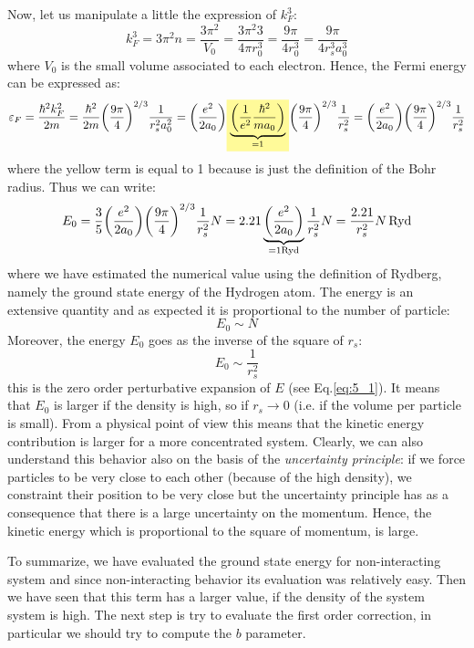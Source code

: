 \documentclass[../main/main.tex]{subfiles}
\begin{document}
Now, let us manipulate a little the expression of  \( k_F^3 \):
\begin{equation*}
  k_F^3 = 3 \pi ^2 n = \frac{3 \pi ^2}{V_0} =
  \frac{3 \pi ^2 3}{4 \pi r_0^3} = \frac{9 \pi }{4 r_0^3} =
  \frac{9 \pi }{4 r_s^3 a_0^3}
\end{equation*}
where \(V_0\) is the small volume associated to each electron.
Hence, the Fermi energy can be expressed as:
\begin{equation*}
  \varepsilon _F = \frac{\hbar ^2 k_F^2}{2m} = \frac{\hbar ^2}{2m} \qty(\frac{9 \pi }{4})^{2/3} \frac{1}{r_s^2 a_0^2}
  = \qty(\frac{e^2}{2 a_0})  \mathcolorbox{yellow!40}{\underbrace{\qty(\frac{1}{e^2} \frac{\hbar ^2}{m a_0})}_{=1}  }
  \qty(\frac{9 \pi }{4})^{2/3 }    \frac{1}{r_s^2}
  = \qty(\frac{e^2}{2 a_0})    \qty(\frac{9 \pi }{4})^{2/3 }    \frac{1}{r_s^2}
\end{equation*}
where the yellow term is equal to 1 because is just the definition of the Bohr radius. Thus we can write:
\begin{equation*}
  E_0 = \frac{3}{5} \qty(\frac{e^2}{2 a_0})    \qty(\frac{9 \pi }{4})^{2/3 }    \frac{1}{r_s^2} N
  = 2.21 \underbrace{ \qty(\frac{e^2}{2 a_0})}_{= 1 \text{Ryd}}  \frac{1}{r_s^2} N
  = \frac{2.21}{r_s^2} N \, \text{Ryd}
\end{equation*}
where we have estimated the numerical value using the definition of Rydberg, namely the ground state energy of the Hydrogen atom.
The energy is an extensive quantity and as expected it is proportional to the number of particle:
\begin{equation*}
  E_0 \sim N
\end{equation*}
Moreover, the energy \( E_0 \) goes as the inverse of the square of \( r_s \):
\begin{equation*}
  E_0 \sim \frac{1}{r_s^2}
\end{equation*}
this is the zero order perturbative expansion of \( E \) (see Eq.\eqref{eq:5_1}).
It means that \( E_0 \) is larger if the density is high, so if \( r_s \rightarrow 0 \) (i.e. if the volume per particle is small).
From a physical point of view this means that the kinetic energy contribution is larger for a more concentrated system.
Clearly, we can also understand this behavior also on the basis of the \emph{uncertainty principle}: if we force particles to be very close to each other (because of the high density), we constraint their position to be very close but the uncertainty principle has as a consequence that there is a large uncertainty on the momentum. Hence, the kinetic energy which is proportional to the square of momentum, is large.

To summarize, we have evaluated the ground state energy for non-interacting system and since non-interacting behavior its evaluation was relatively easy.
Then we have seen that this term has a larger value, if the density of the system system is high.
The next step is try to evaluate the first order correction, in particular we should try to compute the \( b \) parameter.
\end{document}
